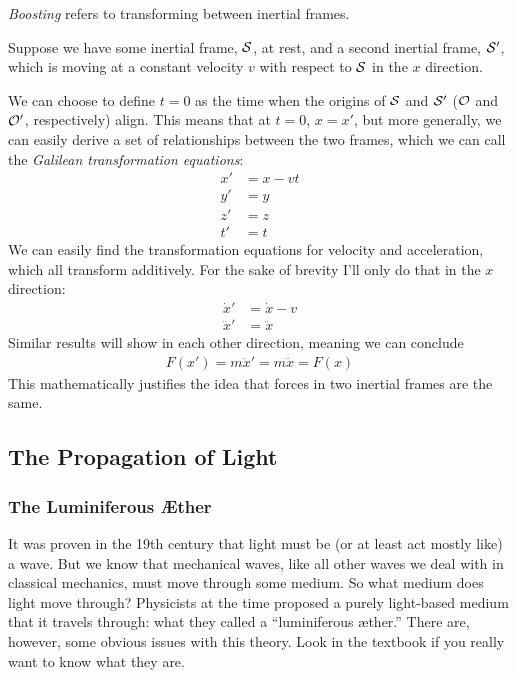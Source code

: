 \documentclass[a4paper]{article}
\begin{document}
\begin{defi}[Boosting]
	\emph{Boosting} refers to transforming between inertial frames.
\end{defi}
Suppose we have some inertial frame, $\S$, at rest, and a second
inertial frame, $\S'$, which is moving at a constant velocity $v$
with respect to $\S$ in the $x$ direction.

We can choose to define $t=0$ as the time when the origins of $\S$ and
$\S'$ ($\Oc$ and $\Oc'$, respectively) align. This means that at
$t=0$, $x=x'$, but more generally, we can easily derive a set of
relationships between the two frames, which we can call the
\emph{Galilean transformation equations}:
\begin{align*}
	x' &= x - vt\\
	y' &= y\\
	z' &= z\\
	t' &= t
\end{align*}
We can easily find the transformation equations for velocity and
acceleration, which all transform additively. For the sake of brevity
I'll only do that in the $x$ direction:
\begin{align*}
	\dot{x}' &= \dot{x}-v\\
	\ddot{x}' &= \ddot{x}
\end{align*}
Similar results will show in each other direction, meaning we can conclude
\begin{align*}
	F(x') = m\ddot{x}' = m\ddot{x} = F(x)
\end{align*}
This mathematically justifies the idea that forces in two inertial frames are
the same.

\subsection{The Propagation of Light}
\subsubsection{The Luminiferous \AE ther}
It was proven in the 19th century that light must be (or at least act mostly
like) a wave. But we know that mechanical waves, like all other waves we
deal with in classical mechanics, must move through some medium. So what
medium does light move through? Physicists at the time proposed a
purely light-based medium that it travels through: what they called a
``luminiferous \ae ther.'' There are, however, some obvious issues with this
theory. Look in the textbook if you really want to know what they are.
\end{document}

